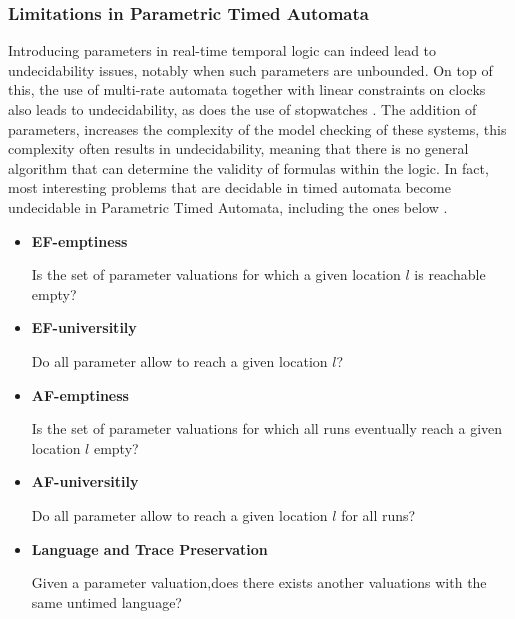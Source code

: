 \subsubsection{Limitations in Parametric Timed Automata}

Introducing parameters in real-time temporal logic can indeed lead to undecidability issues, notably when such parameters are unbounded. On top of this, the use of multi-rate automata together with linear constraints on clocks also leads to undecidability, as does the use of stopwatches \cite{Andre2021}. The addition of parameters, increases the complexity of the model checking of these systems, this complexity often results in undecidability, meaning that there is no general algorithm that can determine the validity of formulas within the logic. In fact, most interesting problems that are decidable in timed automata become undecidable in Parametric Timed Automata, including the ones below \cite{Andre2021}.


\begin{itemize}
    \item \textbf{EF-emptiness}

    Is the set of parameter valuations for which a given location \( l \) is reachable empty?


    \item \textbf{EF-universitily}

    Do all parameter allow to reach a given location \( l \)?


    \item \textbf{AF-emptiness}

    Is the set of parameter valuations for which all runs eventually reach a given location \( l \) empty?


    \item \textbf{AF-universitily}

    Do all parameter allow to reach a given location \( l \) for all runs?


    \item \textbf{Language and Trace Preservation}

    Given a parameter valuation,does there exists another valuations with the same untimed language?

\end{itemize}
 


